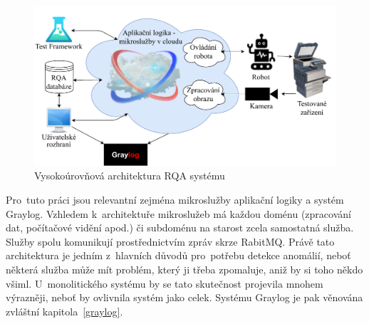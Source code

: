 \begin{figure}[hbt]
	\centering
	\includegraphics[width=1\textwidth]{obrazky/rqa-architecture.pdf}
	\caption{Vysokoúrovňová architektura RQA systému}
	\label{rqa-architecture-img}
\end{figure}

Pro~tuto práci jsou relevantní zejména mikroslužby aplikační logiky a systém Graylog. Vzhledem k~architektuře mikroslužeb má každou doménu (zpracování dat, počítačové vidění apod.) či subdoménu na starost zcela samostatná služba. Služby spolu komunikují prostřednictvím zpráv skrze RabitMQ. Právě tato architektura je jedním z~hlavních důvodů pro~potřebu detekce anomálií, neboť některá služba může mít problém, který ji třeba zpomaluje, aniž by si toho někdo všiml. U~monolitického systému by se tato skutečnost projevila mnohem výrazněji, neboť by ovlivnila systém jako celek. Systému Graylog je pak věnována zvláštní kapitola~\ref{graylog}.